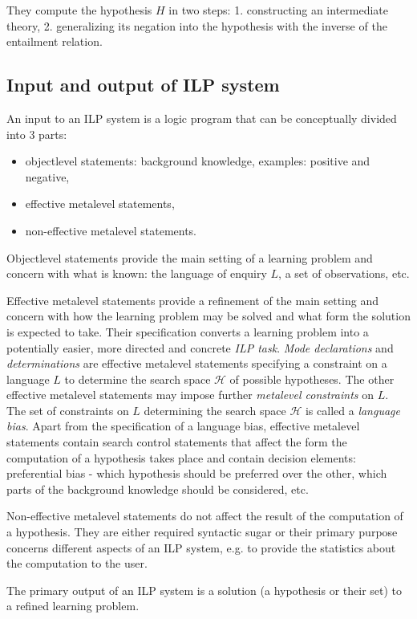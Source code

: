 They compute the hypothesis $H$ in two steps:
1. constructing an intermediate theory, 2. generalizing its negation into the hypothesis with the inverse of the entailment relation.


\subsection{Input and output of ILP system}
An input to an ILP system is a logic program that can be conceptually divided into 3 parts:
\begin{itemize}
\item objectlevel statements: background knowledge, examples: positive and negative,
\item effective metalevel statements,
\item non-effective metalevel statements.
\end{itemize}

Objectlevel statements provide the main setting of a learning problem and concern with what is known: the language of enquiry $L$, a set of observations, etc.

Effective metalevel statements provide a refinement of the main setting and concern with how the learning problem may be solved and what form the solution is expected to take. Their specification converts a learning problem into a potentially easier, more directed and concrete \emph{ILP task}.
\emph{Mode declarations} and \emph{determinations} are effective metalevel statements specifying a constraint on a language $L$ to determine the search space $\mathcal{H}$ of possible hypotheses. The other effective metalevel statements may impose further \emph{metalevel constraints} on $L$. The set of constraints on $L$ determining the search space $\mathcal{H}$ is called a \emph{language bias}.
Apart from the specification of a language bias, effective metalevel statements contain search control statements that affect the form the computation of a hypothesis takes place and contain decision elements: preferential bias - which hypothesis should be preferred over the other, which parts of the background knowledge should be considered, etc.

Non-effective metalevel statements do not affect the result of the computation of a hypothesis. They are either required syntactic sugar or their primary purpose concerns different aspects of an ILP system, e.g. to provide the statistics about the computation to the user.

The primary output of an ILP system is a solution (a hypothesis or their set) to a refined learning problem.

